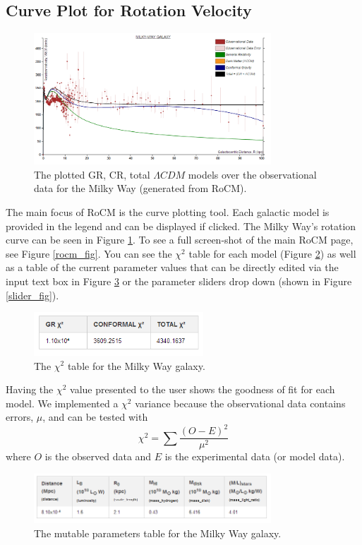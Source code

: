 \documentclass[conference]{IEEEtran}
\begin{document}
\subsection{Curve Plot for Rotation Velocity}
\begin{figure}[h!]
\centering
\includegraphics[width=3.5in, frame]{MILKY-WAY-PLOT}
\caption{The plotted GR, CR, total $\Lambda CDM$ models over the observational data for the Milky Way (generated from RoCM).}
\label{milkywayplot}
\end{figure}
The main focus of RoCM is the curve plotting tool. Each galactic model is provided in the legend and can be displayed if clicked. The Milky Way's rotation curve can be seen in Figure \ref{milkywayplot}. To see a full screen-shot of the main RoCM page, see Figure \ref{rocm_fig}. You can see the $\chi^2$ table for each model (Figure \ref{chi_fig}) as well as a table of the current parameter values that can be directly edited via the input text box in Figure \ref{param_table_fig} or the parameter sliders drop down (shown in Figure \ref{slider_fig}). 

\begin{figure}[h!]
\centering
\includegraphics[width=2.5in]{MILKY-WAY-CHI}
\caption{The $\chi^2$ table for the Milky Way galaxy.}
\label{chi_fig}
\end{figure}

Having the $\chi^2$ value presented to the user shows the goodness of fit for each model. We implemented a $\chi^2$ variance because the observational data contains errors, $\mu$, and can be tested with
\begin{equation}
\chi^2 = \sum \frac{(O-E)^2}{\mu^2}
\end{equation} 
where $O$ is the observed data and $E$ is the experimental data (or model data). 

\begin{figure}[h!]
\centering
\includegraphics[width=3.5in]{MILKY-WAY-PARAMS}
\caption{The mutable parameters table for the Milky Way galaxy.}
\label{param_table_fig}
\end{figure}
\end{document}

